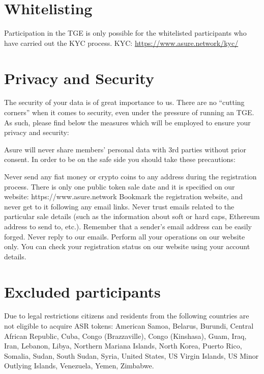 \section{Whitelisting}

Participation in the TGE is only possible for the whitelisted participants who have carried out the KYC process.
\newline\newline
KYC: \url{https://www.asure.network/kyc/}

\section{Privacy and Security}
The security of your data is of great importance to us. There are no “cutting corners” when it comes to security, even under the pressure of running an TGE.  As such, please find below the measures which will be employed to ensure your privacy and security:

Asure will never share members’ personal data with 3rd parties without prior consent. In order to be on the safe side you should take these precautions:

Never send any fiat money or crypto coins to any address during the registration process. There is only one public token sale date and it is specified on our website: https://www.asure.network Bookmark the registration website, and never get to it following any email links.
Never trust emails related to the particular sale details (such as the information about soft or hard caps, Ethereum address to send to, etc.). Remember that a sender’s email address can be easily forged.
Never reply to our emails. Perform all your operations on our website only. You can check your registration status on our website using your account details.


\section{Excluded participants}
Due to legal restrictions citizens and residents from the following countries are not eligible to acquire ASR tokens: American Samoa, Belarus, Burundi, Central African Republic, Cuba, Congo (Brazzaville), Congo (Kinshasa), Guam, Iraq, Iran, Lebanon, Libya, Northern Mariana Islands, North Korea, Puerto Rico, Somalia, Sudan, South Sudan, Syria, United States, US Virgin Islands, US Minor Outlying Islands, Venezuela, Yemen, Zimbabwe.
